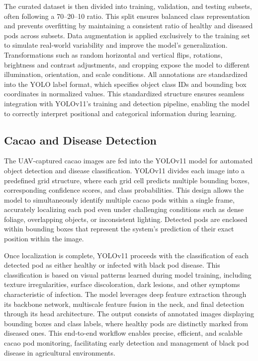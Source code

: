 The curated dataset is then divided into training, validation, and testing subsets, often following a 70–20–10 ratio. This split ensures balanced class representation and prevents overfitting by maintaining a consistent ratio of healthy and diseased pods across subsets. Data augmentation is applied exclusively to the training set to simulate real-world variability and improve the model’s generalization. Transformations such as random horizontal and vertical flips, rotations, brightness and contrast adjustments, and cropping expose the model to different illumination, orientation, and scale conditions. All annotations are standardized into the YOLO label format, which specifies object class IDs and bounding box coordinates in normalized values. This standardized structure ensures seamless integration with YOLOv11’s training and detection pipeline, enabling the model to correctly interpret positional and categorical information during learning.


\subsection*{Cacao and Disease Detection}

The UAV-captured cacao images are fed into the YOLOv11 model for automated object detection and disease classification. YOLOv11 divides each image into a predefined grid structure, where each grid cell predicts multiple bounding boxes, corresponding confidence scores, and class probabilities. This design allows the model to simultaneously identify multiple cacao pods within a single frame, accurately localizing each pod even under challenging conditions such as dense foliage, overlapping objects, or inconsistent lighting. Detected pods are enclosed within bounding boxes that represent the system’s prediction of their exact position within the image.


Once localization is complete, YOLOv11 proceeds with the classification of each detected pod as either healthy or infected with black pod disease. This classification is based on visual patterns learned during model training, including texture irregularities, surface discoloration, dark lesions, and other symptoms characteristic of infection. The model leverages deep feature extraction through its backbone network, multiscale feature fusion in the neck, and final detection through its head architecture. The output consists of annotated images displaying bounding boxes and class labels, where healthy pods are distinctly marked from diseased ones. This end-to-end workflow enables precise, efficient, and scalable cacao pod monitoring, facilitating early detection and management of black pod disease in agricultural environments.



